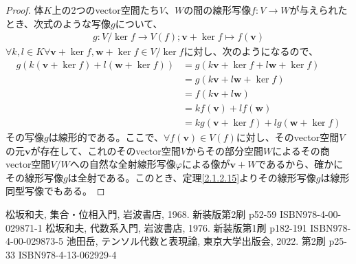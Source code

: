 \documentclass[dvipdfmx]{jsarticle}
\begin{document}
\begin{proof}
体$K$上の2つのvector空間たち$V$、$W$の間の線形写像$f:V \rightarrow W$が与えられたとき、次式のような写像$g$について、
\begin{align*}
g:{V}/{\ker f} \rightarrow V(f);\mathbf{v} + \ker f \mapsto f\left( \mathbf{v} \right)
\end{align*}
$\forall k,l \in K\forall\mathbf{v} + \ker f,\mathbf{w} + \ker f \in {V}/{\ker f}$に対し、次のようになるので、
\begin{align*}
g\left( k\left( \mathbf{v} + \ker f \right) + l\left( \mathbf{w} + \ker f \right) \right) &= g\left( k\mathbf{v} + \ker f + l\mathbf{w} + \ker f \right)\\
&= g\left( k\mathbf{v} + l\mathbf{w} + \ker f \right)\\
&= f\left( k\mathbf{v} + l\mathbf{w} \right)\\
&= kf\left( \mathbf{v} \right) + lf\left( \mathbf{w} \right)\\
&= kg\left( \mathbf{v} + \ker f \right) + lg\left( \mathbf{w} + \ker f \right)
\end{align*}
その写像$g$は線形的である。ここで、$\forall f\left( \mathbf{v} \right) \in V(f)$に対し、そのvector空間$V$の元$\mathbf{v}$が存在して、これのそのvector空間$V$からその部分空間$W$によるその商vector空間${V}/{W}$への自然な全射線形写像$\varphi$による像が$\mathbf{v} + W$であるから、確かにその線形写像$g$は全射である。このとき、定理\ref{2.1.2.15}よりその線形写像$g$は線形同型写像でもある。
\end{proof}
\begin{thebibliography}{50}
  松坂和夫, 集合・位相入門, 岩波書店, 1968. 新装版第2刷 p52-59 ISBN978-4-00-029871-1
  松坂和夫, 代数系入門, 岩波書店, 1976. 新装版第1刷 p182-191 ISBN978-4-00-029873-5
  池田岳, テンソル代数と表現論, 東京大学出版会, 2022. 第2刷 p25-33 ISBN978-4-13-062929-4
\end{thebibliography}
\end{document}
